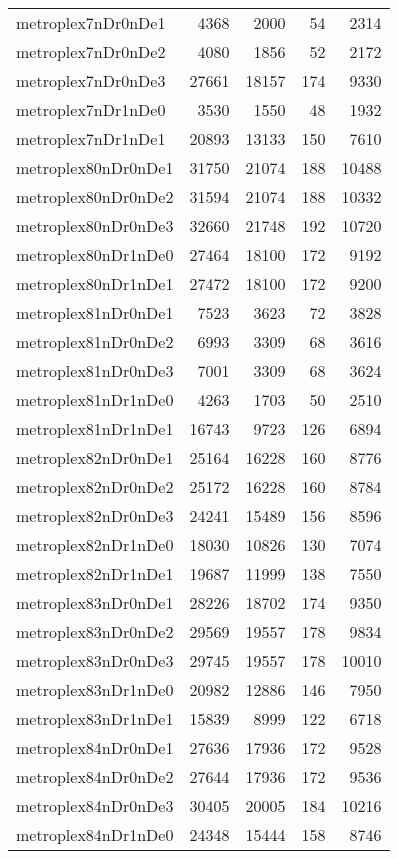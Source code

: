 \begin{longtable}{lrrrr}
metroplex7nDr0nDe1 & 4368 & 2000 & 54 & 2314 \\
metroplex7nDr0nDe2 & 4080 & 1856 & 52 & 2172 \\
metroplex7nDr0nDe3 & 27661 & 18157 & 174 & 9330 \\
metroplex7nDr1nDe0 & 3530 & 1550 & 48 & 1932 \\
metroplex7nDr1nDe1 & 20893 & 13133 & 150 & 7610 \\
metroplex80nDr0nDe1 & 31750 & 21074 & 188 & 10488 \\
metroplex80nDr0nDe2 & 31594 & 21074 & 188 & 10332 \\
metroplex80nDr0nDe3 & 32660 & 21748 & 192 & 10720 \\
metroplex80nDr1nDe0 & 27464 & 18100 & 172 & 9192 \\
metroplex80nDr1nDe1 & 27472 & 18100 & 172 & 9200 \\
metroplex81nDr0nDe1 & 7523 & 3623 & 72 & 3828 \\
metroplex81nDr0nDe2 & 6993 & 3309 & 68 & 3616 \\
metroplex81nDr0nDe3 & 7001 & 3309 & 68 & 3624 \\
metroplex81nDr1nDe0 & 4263 & 1703 & 50 & 2510 \\
metroplex81nDr1nDe1 & 16743 & 9723 & 126 & 6894 \\
metroplex82nDr0nDe1 & 25164 & 16228 & 160 & 8776 \\
metroplex82nDr0nDe2 & 25172 & 16228 & 160 & 8784 \\
metroplex82nDr0nDe3 & 24241 & 15489 & 156 & 8596 \\
metroplex82nDr1nDe0 & 18030 & 10826 & 130 & 7074 \\
metroplex82nDr1nDe1 & 19687 & 11999 & 138 & 7550 \\
metroplex83nDr0nDe1 & 28226 & 18702 & 174 & 9350 \\
metroplex83nDr0nDe2 & 29569 & 19557 & 178 & 9834 \\
metroplex83nDr0nDe3 & 29745 & 19557 & 178 & 10010 \\
metroplex83nDr1nDe0 & 20982 & 12886 & 146 & 7950 \\
metroplex83nDr1nDe1 & 15839 & 8999 & 122 & 6718 \\
metroplex84nDr0nDe1 & 27636 & 17936 & 172 & 9528 \\
metroplex84nDr0nDe2 & 27644 & 17936 & 172 & 9536 \\
metroplex84nDr0nDe3 & 30405 & 20005 & 184 & 10216 \\
metroplex84nDr1nDe0 & 24348 & 15444 & 158 & 8746 \\

\end{longtable}

